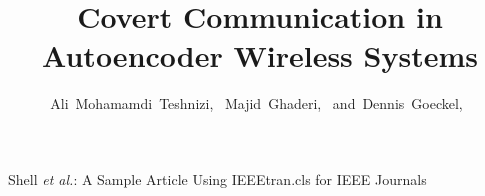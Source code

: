 \documentclass[lettersize,journal]{IEEEtran}
\begin{document}
\title{Covert Communication in \\Autoencoder Wireless Systems}

\author{Ali~Mohamamdi~Teshnizi,~
	Majid~Ghaderi,~
	and~Dennis~Goeckel,~%
}

%
{Shell \MakeLowercase{\textit{et al.}}: A Sample Article Using IEEEtran.cls for IEEE Journals}


\maketitle














\vfill


\end{document}
